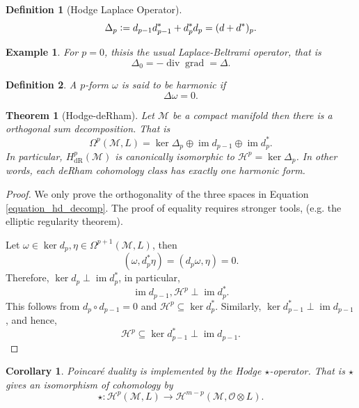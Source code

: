 \documentclass[10pt]{article}
\newtheorem{theorem}{Theorem} [section]
\newtheorem{definition}{Definition}[section]
\newtheorem{corollary}{Corollary} [section]
\newtheorem{example}{Example}[section]
\DeclareMathOperator{\grad}{grad}
\DeclareMathOperator{\diverg}{div}
\DeclareMathOperator{\image}{im}
\DeclareMathOperator{\dR}{dR}
\newcommand{\defeq}{\vcentcolon=}
\newcommand{\M}[0]{\mathcal{M}}
\begin{document}
\begin{definition}[Hodge Laplace Operator]
  \begin{equation*}
    \Delta_p\defeq d_{p-1}d_{p-1}^*+d_p^*d_p = (d+d^*)_p.
  \end{equation*}
\end{definition}
\begin{example}
  For $p=0$, thisis the usual Laplace-Beltrami operator, that is 
  \begin{equation*}
  \Delta_0=-\diverg\grad = \Delta.
  \end{equation*}
\end{example}
\begin{definition}
  A $p$-form $\omega$ is said to be harmonic if 
  \begin{equation*}
  \Delta\omega=0.
  \end{equation*}
\end{definition}
\begin{theorem}[Hodge-deRham]
  Let $\M$ be a compact manifold then there is a orthogonal sum decomposition. That is 
  \begin{equation*}
  \Omega^p(\M,L) = \ker\Delta_p\oplus\image d_{p-1}\oplus \image d_p^*. \tag{HD}\label{equation_hd_decomp}
  \end{equation*}
  In particular, $H^p_{\dR}(\M)$ is canonically isomorphic to $\mathscr{H}^p=\ker\Delta_p$. In other words, each deRham cohomology class has exactly one harmonic form.
\end{theorem}
\begin{proof}
  We only prove the orthogonality of the three spaces in Equation \eqref{equation_hd_decomp}. The proof of equality requires stronger tools, (e.g. the elliptic regularity theorem).
  \par Let $\omega\in\ker d_p,\eta\in\Omega^{p+1}(\M,L)$, then 
  \begin{equation*}
    (\omega,d_p^*\eta)=(d_p\omega,\eta) = 0.
  \end{equation*}
  Therefore, $\ker d_p\perp\image d_p^*$, in particular, 
  \begin{equation*}
    \image d_{p-1},\mathscr{H}^p\perp\image d_p^*.
  \end{equation*}
  This follows from $d_p\circ d_{p-1}=0$ and $\mathscr{H}^p\subseteq \ker d_p^*$. Similarly, $\ker d_{p-1}^*\perp\image d_{p-1}$, and hence,
  \begin{equation*}
    \mathscr{H}^p\subseteq\ker d_{p-1}^*\perp\image d_{p-1}.
  \end{equation*}
\end{proof}
\begin{corollary}
  Poincaré duality is implemented by the Hodge $\star$-operator. That is $\star$ gives an isomorphism of cohomology by
  \begin{equation*}
    \star:\mathscr{H}^p(\M,L)\to\mathscr{H}^{m-p}(\M,\mathcal{O}\otimes L).
  \end{equation*}
\end{corollary}
\end{document}
